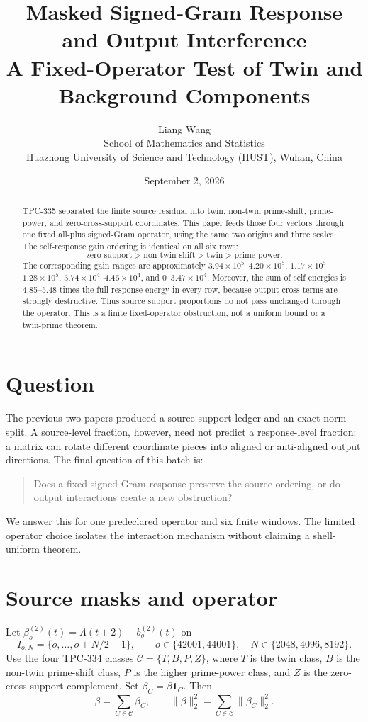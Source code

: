 \documentclass[10pt]{article}
\title{Masked Signed-Gram Response and Output Interference\\
\large A Fixed-Operator Test of Twin and Background Components}
\author{Liang Wang\\School of Mathematics and Statistics\\
Huazhong University of Science and Technology (HUST), Wuhan, China}
\date{September 2, 2026}
\newcommand{\ind}{\mathbf 1}
\begin{document}
\maketitle

\begin{abstract}
TPC-335 separated the finite source residual into twin, non-twin prime-shift,
prime-power, and zero-cross-support coordinates.  This paper feeds those
four vectors through one fixed all-plus signed-Gram operator, using the same
two origins and three scales.  The self-response gain ordering is identical
on all six rows:
\[
 \text{zero support} > \text{non-twin shift} > \text{twin} >
 \text{prime power}.
\]
The corresponding gain ranges are approximately $3.94\times10^5$--$4.20\times10^5$,
$1.17\times10^5$--$1.28\times10^5$, $3.74\times10^4$--$4.46\times10^4$,
and $0$--$3.47\times10^4$.  Moreover, the sum of self energies is
4.85--5.48 times the full response energy in every row, because output cross
terms are strongly destructive.  Thus source support proportions do not pass
unchanged through the operator.  This is a finite fixed-operator obstruction,
not a uniform bound or a twin-prime theorem.
\end{abstract}

\section{Question}
The previous two papers produced a source support ledger and an exact norm
split.  A source-level fraction, however, need not predict a response-level
fraction: a matrix can rotate different coordinate pieces into aligned or
anti-aligned output directions.  The final question of this batch is:
\begin{quote}
Does a fixed signed-Gram response preserve the source ordering, or do output
interactions create a new obstruction?
\end{quote}
We answer this for one predeclared operator and six finite windows.  The
limited operator choice isolates the interaction mechanism without claiming a
shell-uniform theorem.

\section{Source masks and operator}
Let $\beta_o^{(2)}(t)=\Lambda(t+2)-b_o^{(2)}(t)$ on
\[
 I_{o,N}=\{o,\ldots,o+N/2-1\},\qquad
 o\in\{42001,44001\},\quad N\in\{2048,4096,8192\}.
\]
Use the four TPC-334 classes $\mathcal C=\{T,B,P,Z\}$, where $T$ is the twin
class, $B$ is the non-twin prime-shift class, $P$ is the higher prime-power
class, and $Z$ is the zero-cross-support complement.  Set
$\beta_C=\beta\ind_C$.  Then
\begin{equation}\label{eq:norm}
 \beta=\sum_{C\in\mathcal C}\beta_C,\qquad
 \|\beta\|_2^2=\sum_{C\in\mathcal C}\|\beta_C\|_2^2.
\end{equation}
\end{document}
